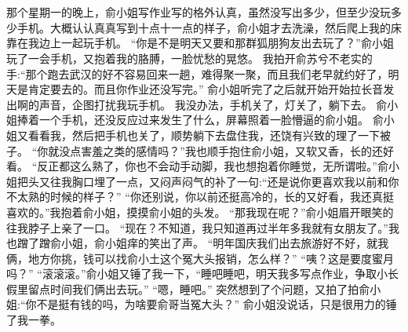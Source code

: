 \chapter{}
那个星期一的晚上，俞小姐写作业写的格外认真，虽然没写出多少，但至少没玩多少手机。大概认认真真写到十点十一点的样子，俞小姐才去洗澡，然后爬上我的床 靠在我边上一起玩手机。
“你是不是明天又要和那群狐朋狗友出去玩了？”俞小姐玩了一会手机，又抱着我的胳膊，一脸忧愁的晃悠。
我拍开俞苏兮不老实的手:“那个跑去武汉的好不容易回来一趟，难得聚一聚，而且我们老早就约好了，明天是肯定要去的。而且你作业还没写完。”
俞小姐听完了之后就开始开始拉长音发出啊的声音，企图打扰我玩手机。
我没办法，手机关了，灯关了，躺下去。
俞小姐捧着一个手机，还没反应过来发生了什么，屏幕照着一脸懵逼的俞小姐。
俞小姐又看看我，然后把手机也关了，顺势躺下去盘住我，还饶有兴致的理了一下被子。
“你就没点害羞之类的感情吗？”我也顺手抱住俞小姐，又软又香，长的还好看。
“反正都这么熟了，你也不会动手动脚，我也想抱着你睡觉，无所谓啦。”俞小姐把头又往我胸口埋了一点，又闷声闷气的补了一句:“还是说你更喜欢我以前和你不太熟的时候的样子？”
“你还别说，你以前还挺高冷的，长的又好看，我还真挺喜欢的。”我抱着俞小姐，摸摸俞小姐的头发。
“那我现在呢？”俞小姐眉开眼笑的往我脖子上亲了一口。
“现在？不知道，我只知道再过半年多我就有女朋友了。”我也蹭了蹭俞小姐，俞小姐痒的笑出了声。
“明年国庆我们出去旅游好不好，就我俩，地方你挑，钱可以找俞小土这个冤大头报销，怎么样？”
“咦？这是要度蜜月吗？”
“滚滚滚。”俞小姐又锤了我一下，“睡吧睡吧，明天我多写点作业，争取小长假里留点时间我们俩出去玩。”
“嗯，睡吧。”
突然想到了个问题，又拍了拍俞小姐:“你不是挺有钱的吗，为啥要俞哥当冤大头？”
俞小姐没说话，只是很用力的锤了我一拳。

